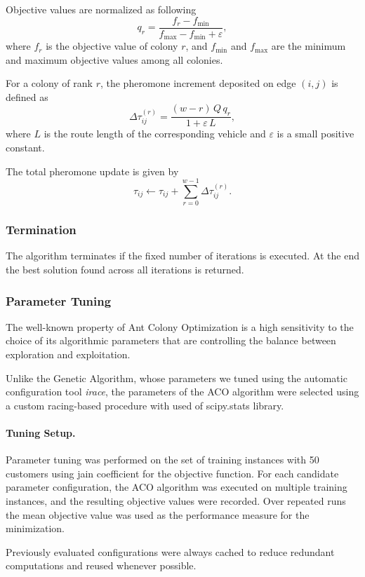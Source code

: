 \documentclass[12pt]{article}
\begin{document}
Objective values are normalized as following
\[
q_r
=
\frac{f_r - f_{\min}}
{f_{\max} - f_{\min} + \varepsilon},
\]
where $f_r$ is the objective value of colony $r$, and
$f_{\min}$ and $f_{\max}$ are the minimum and maximum objective values among all colonies.

For a colony of rank $r$, the pheromone increment deposited on edge $(i,j)$ is defined as
\[
\Delta \tau_{ij}^{(r)}
=
\frac{(w - r)\, Q \, q_r}
{1 + \varepsilon \, L},
\]
where $L$ is the route length of the corresponding vehicle and
$\varepsilon$ is a small positive constant.

The total pheromone update is given by
\[
\tau_{ij} \leftarrow \tau_{ij}
+ \sum_{r=0}^{w-1} \Delta \tau_{ij}^{(r)}.
\]

\subsubsection{Termination}

The algorithm terminates if the fixed number of iterations is executed.
 At the end the best solution found across all iterations is returned.

\subsubsection{Parameter Tuning}

The well-known property of Ant Colony Optimization is a high sensitivity to the choice of its algorithmic parameters that are controlling the balance between exploration and exploitation.

Unlike the Genetic Algorithm, whose parameters we tuned using the automatic configuration tool \textit{irace}, the parameters of the ACO algorithm were selected using a custom racing-based procedure with used of scipy.stats library.

\paragraph{Tuning Setup.}
Parameter tuning was performed on the set of training instances with 50 customers using jain coefficient for the objective function.
For each candidate parameter configuration, the ACO algorithm was executed on multiple training instances, and the resulting objective values were recorded. Over repeated runs the mean objective value was used as the performance measure for the minimization.

Previously evaluated configurations were always cached to reduce redundant computations and reused whenever possible.
\end{document}
